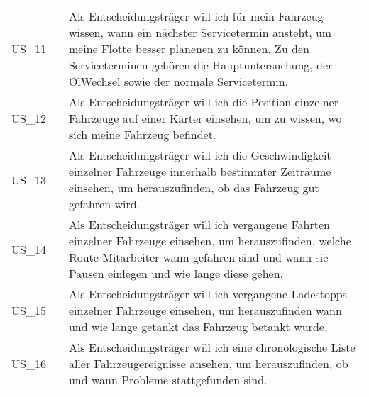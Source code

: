 \begin{footnotesize}
\begin{longtable}[i i L]{ p{} p{} p{} }
      US\_11 & & Als Entscheidungsträger will ich für mein Fahrzeug wissen, wann ein nächster Servicetermin ansteht, um meine Flotte besser planenen zu können. Zu den Serviceterminen gehören die Hauptuntersuchung, der ÖlWechsel sowie der normale Servicetermin. \\
      US\_12 & & Als Entscheidungsträger will ich die Position einzelner Fahrzeuge auf einer Karter einsehen, um zu wissen, wo sich meine Fahrzeug befindet. \\
      US\_13 & & Als Entscheidungsträger will ich die Geschwindigkeit einzelner Fahrzeuge innerhalb bestimmter Zeiträume einsehen, um herauszufinden, ob das Fahrzeug gut gefahren wird. \\
      US\_14 & & Als Entscheidungsträger will ich vergangene Fahrten einzelner Fahrzeuge einsehen, um herauszufinden, welche Route Mitarbeiter wann gefahren sind und wann sie Pausen einlegen und wie lange diese gehen. \\
      US\_15 & & Als Entscheidungsträger will ich vergangene Ladestopps einzelner Fahrzeuge einsehen, um herauszufinden wann und wie lange getankt das Fahrzeug betankt wurde. \\
      US\_16 & & Als Entscheidungsträger will ich eine chronologische Liste aller Fahrzeugereignisse ansehen, um herauszufinden, ob und wann Probleme stattgefunden sind. \\
     
      \bottomrule
    \end{longtable}
  \end{footnotesize}
  \rmfamily
